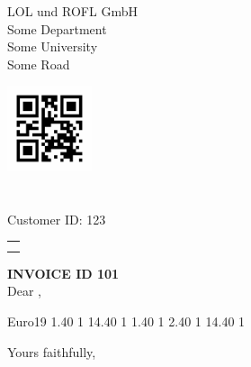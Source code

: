 \documentclass{letter}
\makeatletter
\renewcommand*{\opening}[1]{\ifx\@empty\fromaddress%
  \thispagestyle{firstpage}%
    {\raggedleft\@date\par}%
  \else%
   \thispagestyle{empty}%
   {%
    \begin{minipage}[c]{0.50\linewidth}
    \includegraphics[height=2.5cm, keepaspectratio=true]{qr.png}\\ 
    \toname \\
    \toaddress\\[0.1em]
    Customer ID: 123\\[1.1em]%
    \end{minipage}
    \begin{minipage}[c]{0.45\linewidth}
    \raggedleft\begin{tabular}{l@{}}\ignorespaces
    \fromaddress\\[2.9em]%
    \@date
    \end{tabular}
    \end{minipage}
    \par
}%
  \fi
  \vspace{2\parskip}%
  #1\par\nobreak}
\makeatother
\begin{document}
%
    \begin{letter}{%
            LOL und ROFL GmbH\\%
            Some Department\\%
            Some University\\%
            Some Road\\%
        }%
%
%       
        \opening{{\large \bf INVOICE ID 101} \\[1.0cm] Dear \toname{},}\hfil
%
            \begin{invoice}{Euro}{19} 
             {1.40} {1} 
             {14.40} {1}
             {1.40} {1} 
             {2.40} {1} 
             {14.40} {1}
            \end{invoice} 

        \closing{Yours faithfully,\\
         \\
        }
        
        
    \end{letter}%
\end{document}
